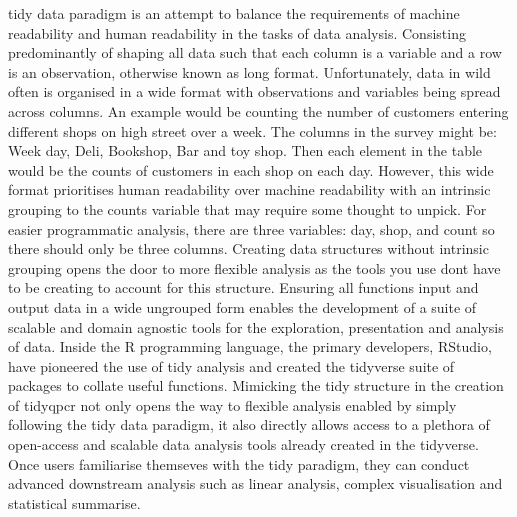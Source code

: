 \documentclass{SBCbookchapter}
\begin{document}
tidy data paradigm is an attempt to balance the requirements of machine readability and human readability in the tasks of data analysis. Consisting predominantly of shaping all data such that each column is a variable and a row is an observation, otherwise known as long format. Unfortunately, data in wild often is organised in a wide format with observations and variables being spread across columns. An example would be counting the number of customers entering different shops on high street over a week. The columns in the survey might be: Week day, Deli, Bookshop, Bar and toy shop. Then each element in the table would be the counts of customers in each shop on each day. However, this wide format prioritises human readability over machine readability with an intrinsic grouping to the counts variable that may require some thought to unpick. For easier programmatic analysis, there are three variables: day, shop, and count so there should only be three columns. Creating data structures without intrinsic grouping opens the door to more flexible analysis as the tools you use dont have to be creating to account for this structure. Ensuring all functions input and output data in a wide ungrouped form enables the development of a suite of scalable and domain agnostic tools for the exploration, presentation and analysis of data. Inside the R programming language, the primary developers, RStudio, have pioneered the use of tidy analysis and created the tidyverse suite of packages to collate useful functions. Mimicking the tidy structure in the creation of tidyqpcr not only opens the way to flexible analysis enabled by simply following the tidy data paradigm, it also directly allows access to a plethora of open-access and scalable data analysis tools already created in the tidyverse. Once users familiarise themseves with the tidy paradigm, they can conduct advanced downstream analysis such as linear analysis, complex visualisation and statistical summarise. 
\end{document}
